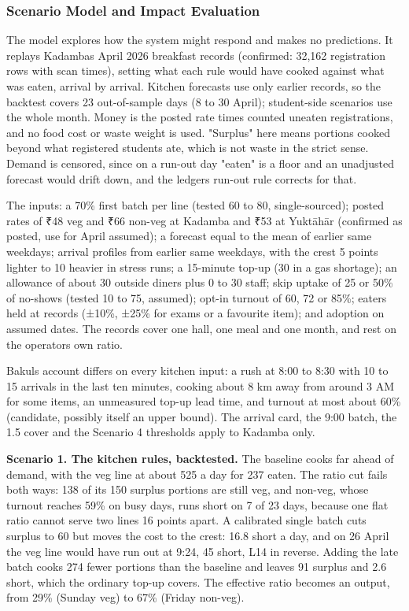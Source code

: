 \documentclass[
  10pt,
  table]{article}
\begin{document}
\subsubsection{Scenario Model and Impact Evaluation}\label{scenario-model-and-impact-evaluation}

The model explores how the system might respond and makes no predictions. It replays Kadamba\textquotesingle s April 2026 breakfast records (confirmed: 32,162 registration rows with scan times), setting what each rule would have cooked against what was eaten, arrival by arrival. Kitchen forecasts use only earlier records, so the backtest covers 23 out-of-sample days (8 to 30 April); student-side scenarios use the whole month. Money is the posted rate times counted uneaten registrations, and no food cost or waste weight is used. "Surplus" here means portions cooked beyond what registered students ate, which is not waste in the strict sense. Demand is censored, since on a run-out day "eaten" is a floor and an unadjusted forecast would drift down, and the ledger\textquotesingle s run-out rule corrects for that.

The inputs: a 70\% first batch per line (tested 60 to 80, single-sourced); posted rates of ₹48 veg and ₹66 non-veg at Kadamba and ₹53 at Yuktāhār (confirmed as posted, use for April assumed); a forecast equal to the mean of earlier same weekdays; arrival profiles from earlier same weekdays, with the crest 5 points lighter to 10 heavier in stress runs; a 15-minute top-up (30 in a gas shortage); an allowance of about 30 outside diners plus 0 to 30 staff; skip uptake of 25 or 50\% of no-shows (tested 10 to 75, assumed); opt-in turnout of 60, 72 or 85\%; eaters held at records (±10\%, ±25\% for exams or a favourite item); and adoption on assumed dates. The records cover one hall, one meal and one month, and rest on the operator\textquotesingle s own ratio.

Bakul\textquotesingle s account differs on every kitchen input: a rush at 8:00 to 8:30 with 10 to 15 arrivals in the last ten minutes, cooking about 8 km away from around 3 AM for some items, an unmeasured top-up lead time, and turnout at most about 60\% (candidate, possibly itself an upper bound). The arrival card, the 9:00 batch, the 1.5 cover and the Scenario 4 thresholds apply to Kadamba only.

\textbf{Scenario 1. The kitchen rules, backtested.} The baseline cooks far ahead of demand, with the veg line at about 525 a day for 237 eaten. The ratio cut fails both ways: 138 of its 150 surplus portions are still veg, and non-veg, whose turnout reaches 59\% on busy days, runs short on 7 of 23 days, because one flat ratio cannot serve two lines 16 points apart. A calibrated single batch cuts surplus to 60 but moves the cost to the crest: 16.8 short a day, and on 26 April the veg line would have run out at 9:24, 45 short, L14 in reverse. Adding the late batch cooks 274 fewer portions than the baseline and leaves 91 surplus and 2.6 short, which the ordinary top-up covers. The effective ratio becomes an output, from 29\% (Sunday veg) to 67\% (Friday non-veg).
\end{document}
